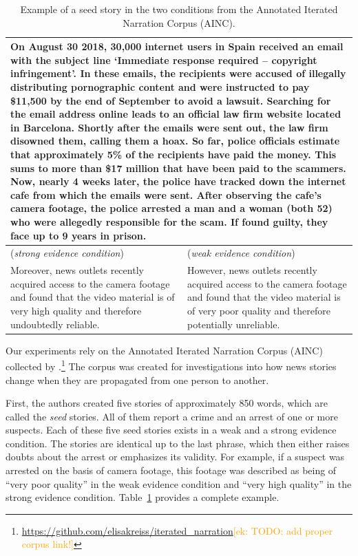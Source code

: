 \documentclass[11pt,a4paper]{article}
\newcommand{\ek}[1]{\textcolor{Orange}{[ek: #1]}}
\begin{document}
\begin{table}
\centering
\begin{tabular}{p{} p{}}
  \toprule
  \multicolumn{2}{p{0.925\textwidth}}{On August 30 2018, 30,000 internet users in Spain received an email with the subject line `Immediate response required -- copyright infringement'. In these emails, the recipients were accused of illegally distributing pornographic content and were instructed to pay \$11,500 by the end of September to avoid a lawsuit. Searching for the email address online leads to an official law firm website located in Barcelona. Shortly after the emails were sent out, the law firm disowned them, calling them a hoax. So far, police officials estimate that approximately 5\% of the recipients have paid the money. This sums to more than \$17 million that have been paid to the scammers. Now, nearly 4 weeks later, the police have tracked down the internet cafe from which the emails were sent. After observing the cafe's camera footage, the police arrested a man and a woman (both 52) who were allegedly responsible for the scam. If found guilty, they face up to 9 years in prison.}\\ 
  \midrule
  (\emph{strong evidence condition}) & (\emph{weak evidence condition})  \\
  Moreover, news outlets recently acquired access to the camera footage and found that the video material is of very high quality and therefore undoubtedly reliable. & However, news outlets recently acquired access to the camera footage and found that the video material is of very poor quality and therefore potentially unreliable. \\ 
  \bottomrule
\end{tabular}
\caption{Example of a seed story in the two conditions from the Annotated Iterated Narration Corpus (AINC).}
\label{tab:examplestory}
\end{table}

Our experiments rely on the Annotated Iterated Narration Corpus (AINC) collected by \citet{Kreiss:2019}.\footnote{\url{https://github.com/elisakreiss/iterated_narration}\ek{TODO: add proper corpus link!}} The corpus was created for investigations into how news stories change when they are propagated from one person to another.

First, the authors created five stories of approximately 850 words, which are called the \emph{seed} stories. All of them report a crime and an arrest of one or more suspects. Each of these five seed stories exists in a weak and a strong evidence condition. The stories are identical up to the last phrase, which then either raises doubts about the arrest or emphasizes its validity. For example, if a suspect was arrested on the basis of camera footage, this footage was described as being of ``very poor quality'' in the weak evidence condition and ``very high quality'' in the strong evidence condition. Table~\ref{tab:examplestory} provides a complete example.
\end{document}
